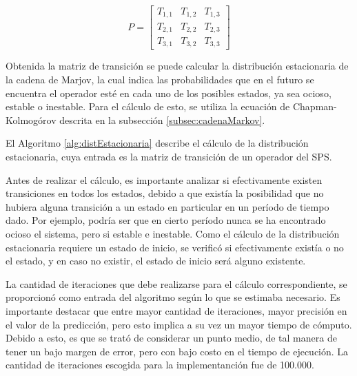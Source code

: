 \begin{equation} \label{eq:matrizTransicionPredictive}
	P =
	\begin{bmatrix}
		T_{1,1} & T_{1,2} & T_{1,3} \\
		T_{2,1} & T_{2,2} & T_{2,3} \\
		T_{3,1} & T_{3,2} & T_{3,3}
	\end{bmatrix}	
\end{equation}

Obtenida la matriz de transición se puede calcular la distribución estacionaria de la cadena de Marjov, la cual indica las probabilidades que en el futuro se encuentra el operador esté en cada uno de los posibles estados, ya sea ocioso, estable o inestable. Para el cálculo de esto, se utiliza la ecuación de Chapman-Kolmogórov \citep{Papoulis1984} descrita en la subsección \ref{subsec:cadenaMarkov}.

El Algoritmo \ref{alg:distEstacionaria} describe el cálculo de la distribución estacionaria, cuya entrada es la matriz de transición de un operador del SPS. 

Antes de realizar el cálculo, es importante analizar si efectivamente existen transiciones en todos los estados, debido a que existía la posibilidad que no hubiera alguna transición a un estado en particular en un período de tiempo dado. Por ejemplo, podría ser que en cierto período nunca se ha encontrado ocioso el sistema, pero si estable e inestable. Como el cálculo de la distribución estacionaria requiere un estado de inicio, se verificó si efectivamente existía o no el estado, y en caso no existir, el estado de inicio será alguno existente.

La cantidad de iteraciones que debe realizarse para el cálculo correspondiente, se proporcionó como entrada del algoritmo según lo que se estimaba necesario. Es importante destacar que entre mayor cantidad de iteraciones, mayor precisión en el valor de la predicción, pero esto implica a su vez un mayor tiempo de cómputo. Debido a esto, es que se trató de considerar un punto medio, de tal manera de tener un bajo margen de error, pero con bajo costo en el tiempo de ejecución. La cantidad de iteraciones escogida para la implementanción fue de 100.000.

